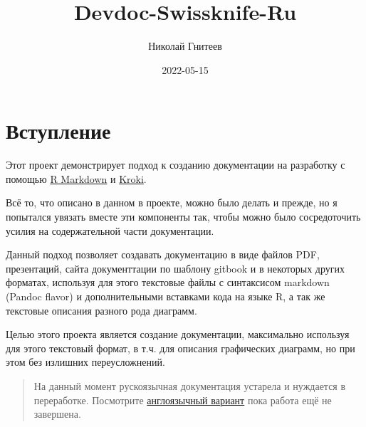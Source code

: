 \documentclass[
  12pt,
  russian,
  a4paper,
  12pt,
  oneside,
  openany]{book}
\title{Devdoc-Swissknife-Ru}
\author{Николай Гнитеев}
\date{2022-05-15}
\begin{document}
\maketitle

{
\hypersetup{linkcolor=}
\setcounter{tocdepth}{2}
\tableofcontents
}
\listoftables
\listoffigures
\hypertarget{ux432ux441ux442ux443ux43fux43bux435ux43dux438ux435}{%
\chapter*{Вступление}\label{ux432ux441ux442ux443ux43fux43bux435ux43dux438ux435}}


Этот проект демонстрирует подход к созданию документации на разработку с помощью \href{https://rmarkdown.rstudio.com/}{R Markdown} и \href{https://kroki.io/}{Kroki}.

Всё то, что описано в данном в проекте, можно было делать и прежде, но я попытался увязать вместе эти компоненты так, чтобы можно было сосредоточить усилия на содержательной части документации.

Данный подход позволяет создавать документацию в виде файлов PDF, презентаций, сайта документтации по шаблону gitbook и в некоторых других форматах, используя для этого текстовые файлы с синтаксисом markdown (Pandoc flavor) и дополнительными вставками кода на языке R, а так же текстовые описания разного рода диаграмм.

Целью этого проекта является создание документации, максимально используя для этого текстовый формат, в т.ч. для описания графических диаграмм, но при этом без излишних переусложнений.

\begin{quote}
На данный момент рускоязычная документация устарела и нуждается в переработке. Посмотрите \href{devdoc-swissknife-en/index.html}{англоязычный вариант} пока работа ещё не завершена.
\end{quote}

  
\end{document}
